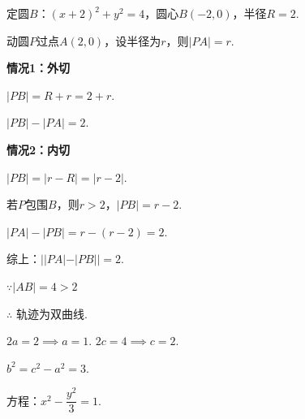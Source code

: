 \documentclass{article}
\begin{document}
\begin{minipage}{0.7\textwidth}
定圆$B$：$(x+2)^2+y^2=4$，圆心$B(-2,0)$，半径$R=2$.

动圆$P$过点$A(2,0)$，设半径为$r$，则$|PA|=r$.

\textbf{情况1：外切}

$|PB| = R+r = 2+r$.

$|PB| - |PA| = 2$.

\textbf{情况2：内切}

$|PB| = |r-R| = |r-2|$.

若$P$包围$B$，则$r>2$，$|PB|=r-2$.

$|PA| - |PB| = r - (r-2) = 2$.


综上：$||PA|-|PB|| = 2$.

$\because |AB|=4 > 2$

$\therefore$ 轨迹为双曲线.

$2a=2 \implies a=1$. $2c=4 \implies c=2$.

$b^2 = c^2-a^2 = 3$.

方程：$x^2 - \dfrac{y^2}{3} = 1$.
\end{minipage}
\hfill
\end{document}
